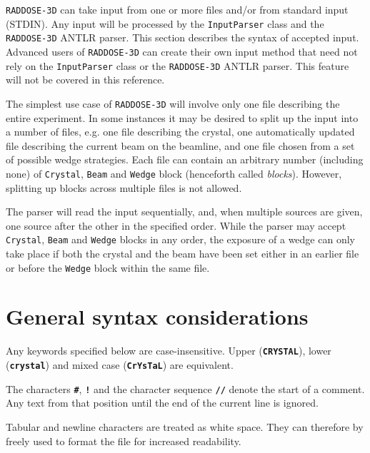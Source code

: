 \documentclass[a4paper]{article}
\newcommand{\RD}{\texttt{RADDOSE-3D}\xspace}
\newcommand{\Class}[1]{\texttt{#1}\xspace}
\newcommand{\Keyword}[1]{\texttt{\textbf{#1}}\xspace}
\begin{document}
\tableofcontents


\newpage

\RD can take input from one or more files and/or from standard input (STDIN).
Any input will be processed by the \Class{InputParser} class and the \RD ANTLR parser.
This section describes the syntax of accepted input.
Advanced users of \RD can create their own input method that need not rely on the \Class{InputParser} class or the \RD ANTLR parser. This feature will not be covered in this reference.

The simplest use case of \RD will involve only one file describing the entire experiment.
In some instances it may be desired to split up the input into a number of files, e.g. one file describing the crystal, one automatically updated file describing the current beam on the beamline, and one file chosen from a set of possible wedge strategies.
Each file can contain an arbitrary number (including none) of \Class{Crystal}, \Class{Beam} and \Class{Wedge} block (henceforth called \textit{blocks}). However, splitting up blocks across multiple files is not allowed.

The parser will read the input sequentially, and, when multiple sources are given, one source after the other in the specified order. While the parser may accept \Class{Crystal}, \Class{Beam} and \Class{Wedge} blocks in any order, the exposure of a wedge can only take place if both the crystal and the beam have been set either in an earlier file or before the \Class{Wedge} block within the same file.


\section{General syntax considerations}

Any keywords specified below are case-insensitive. Upper (\Keyword{CRYSTAL}), lower (\Keyword{crystal}) and mixed case (\Keyword{CrYsTaL}) are equivalent.

The characters \Keyword{\#}, \Keyword{!} and the character sequence \Keyword{//} denote the start of a comment.
Any text from that position until the end of the current line is ignored.

Tabular and newline characters are treated as white space.
They can therefore by freely used to format the file for increased readability.
\end{document}
